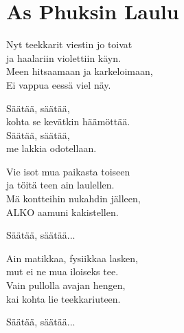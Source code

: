 \section{As Phuksin Laulu}
Nyt teekkarit viestin jo toivat\\
ja haalariin violettiin käyn.\\
Meen hitsaamaan ja karkeloimaan,\\
Ei vappua eessä viel näy.

Säätää, säätää,\\
kohta se kevätkin häämöttää.\\
Säätää, säätää,\\
me lakkia odotellaan.

Vie isot mua paikasta toiseen\\
ja töitä teen ain laulellen.\\
Mä kontteihin nukahdin jälleen,\\
ALKO aamuni kakistellen.

Säätää, säätää...

Ain matikkaa, fysiikkaa lasken,\\
mut ei ne mua iloiseks tee.\\
Vain pullolla avajan hengen,\\
kai kohta lie teekkariuteen.

Säätää, säätää...